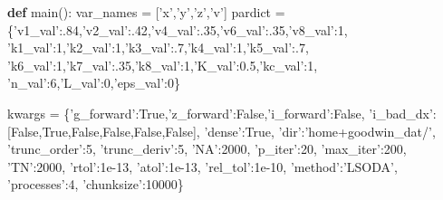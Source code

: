 \documentclass[english,a4paper,oneside]{article}
\newenvironment{Shaded}{}{}
\newcommand{\DecValTok}[1]{\textcolor[rgb]{0.25,0.63,0.44}{#1}}
\newcommand{\FloatTok}[1]{\textcolor[rgb]{0.25,0.63,0.44}{#1}}
\newcommand{\KeywordTok}[1]{\textcolor[rgb]{0.00,0.44,0.13}{\textbf{#1}}}
\newcommand{\NormalTok}[1]{#1}
\newcommand{\OperatorTok}[1]{\textcolor[rgb]{0.40,0.40,0.40}{#1}}
\newcommand{\StringTok}[1]{\textcolor[rgb]{0.25,0.44,0.63}{#1}}
\newcommand{\VariableTok}[1]{\textcolor[rgb]{0.10,0.09,0.49}{#1}}
\begin{document}
\begin{Shaded}
\begin{Highlighting}[]
\KeywordTok{def}\NormalTok{ main():}
\NormalTok{    var_names }\OperatorTok{=}\NormalTok{ [}\StringTok{'x'}\NormalTok{,}\StringTok{'y'}\NormalTok{,}\StringTok{'z'}\NormalTok{,}\StringTok{'v'}\NormalTok{]}
\NormalTok{    pardict }\OperatorTok{=}\NormalTok{ \{}\StringTok{'v1_val'}\NormalTok{:.}\DecValTok{84}\NormalTok{,}\StringTok{'v2_val'}\NormalTok{:.}\DecValTok{42}\NormalTok{,}\StringTok{'v4_val'}\NormalTok{:.}\DecValTok{35}\NormalTok{,}\StringTok{'v6_val'}\NormalTok{:.}\DecValTok{35}\NormalTok{,}\StringTok{'v8_val'}\NormalTok{:}\DecValTok{1}\NormalTok{,}
               \StringTok{'k1_val'}\NormalTok{:}\DecValTok{1}\NormalTok{,}\StringTok{'k2_val'}\NormalTok{:}\DecValTok{1}\NormalTok{,}\StringTok{'k3_val'}\NormalTok{:.}\DecValTok{7}\NormalTok{,}\StringTok{'k4_val'}\NormalTok{:}\DecValTok{1}\NormalTok{,}\StringTok{'k5_val'}\NormalTok{:.}\DecValTok{7}\NormalTok{,}
               \StringTok{'k6_val'}\NormalTok{:}\DecValTok{1}\NormalTok{,}\StringTok{'k7_val'}\NormalTok{:.}\DecValTok{35}\NormalTok{,}\StringTok{'k8_val'}\NormalTok{:}\DecValTok{1}\NormalTok{,}\StringTok{'K_val'}\NormalTok{:}\FloatTok{0.5}\NormalTok{,}\StringTok{'kc_val'}\NormalTok{:}\DecValTok{1}\NormalTok{,}
               \StringTok{'n_val'}\NormalTok{:}\DecValTok{6}\NormalTok{,}\StringTok{'L_val'}\NormalTok{:}\DecValTok{0}\NormalTok{,}\StringTok{'eps_val'}\NormalTok{:}\DecValTok{0}\NormalTok{\}}
    
\NormalTok{    kwargs }\OperatorTok{=}\NormalTok{ \{}\StringTok{'g_forward'}\NormalTok{:}\VariableTok{True}\NormalTok{,}\StringTok{'z_forward'}\NormalTok{:}\VariableTok{False}\NormalTok{,}\StringTok{'i_forward'}\NormalTok{:}\VariableTok{False}\NormalTok{,}
              \StringTok{'i_bad_dx'}\NormalTok{:[}\VariableTok{False}\NormalTok{,}\VariableTok{True}\NormalTok{,}\VariableTok{False}\NormalTok{,}\VariableTok{False}\NormalTok{,}\VariableTok{False}\NormalTok{,}\VariableTok{False}\NormalTok{],}
              \StringTok{'dense'}\NormalTok{:}\VariableTok{True}\NormalTok{,}
              \StringTok{'dir'}\NormalTok{:}\StringTok{'home+goodwin_dat/'}\NormalTok{,}
              \StringTok{'trunc_order'}\NormalTok{:}\DecValTok{5}\NormalTok{,}
              \StringTok{'trunc_deriv'}\NormalTok{:}\DecValTok{5}\NormalTok{,}
              \StringTok{'NA'}\NormalTok{:}\DecValTok{2000}\NormalTok{,}
              \StringTok{'p_iter'}\NormalTok{:}\DecValTok{20}\NormalTok{,}
              \StringTok{'max_iter'}\NormalTok{:}\DecValTok{200}\NormalTok{,}
              \StringTok{'TN'}\NormalTok{:}\DecValTok{2000}\NormalTok{,}
              \StringTok{'rtol'}\NormalTok{:}\FloatTok{1e-13}\NormalTok{,}
              \StringTok{'atol'}\NormalTok{:}\FloatTok{1e-13}\NormalTok{,}
              \StringTok{'rel_tol'}\NormalTok{:}\FloatTok{1e-10}\NormalTok{,}
              \StringTok{'method'}\NormalTok{:}\StringTok{'LSODA'}\NormalTok{,}
              \StringTok{'processes'}\NormalTok{:}\DecValTok{4}\NormalTok{,}
              \StringTok{'chunksize'}\NormalTok{:}\DecValTok{10000}\NormalTok{\}}
              

\end{Highlighting}
\end{Shaded}
\end{document}
